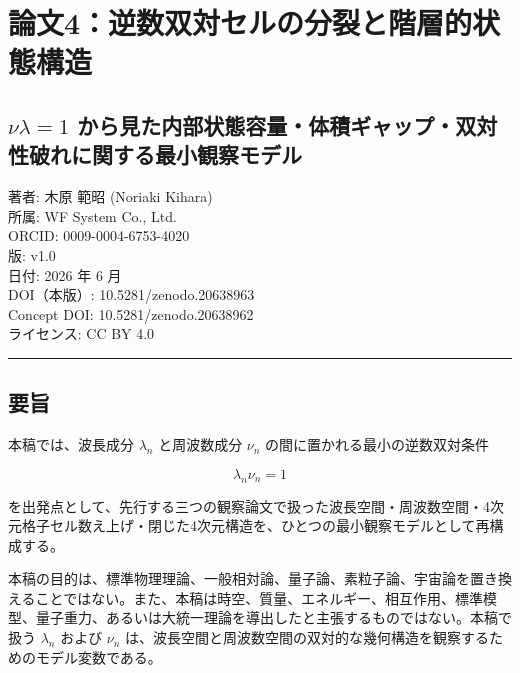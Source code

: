 \documentclass[
]{ltjsarticle}
\author{}
\date{}
\begin{document}
\section{論文4：逆数双対セルの分裂と階層的状態構造}\label{ux8ad6ux65874ux9006ux6570ux53ccux5bfeux30bbux30ebux306eux5206ux88c2ux3068ux968eux5c64ux7684ux72b6ux614bux69cbux9020}

\subsection{\texorpdfstring{\(\nu\lambda=1\)
から見た内部状態容量・体積ギャップ・双対性破れに関する最小観察モデル}{\textbackslash nu\textbackslash lambda=1 から見た内部状態容量・体積ギャップ・双対性破れに関する最小観察モデル}}\label{nulambda1-ux304bux3089ux898bux305fux5185ux90e8ux72b6ux614bux5bb9ux91cfux4f53ux7a4dux30aeux30e3ux30c3ux30d7ux53ccux5bfeux6027ux7834ux308cux306bux95a2ux3059ux308bux6700ux5c0fux89b3ux5bdfux30e2ux30c7ux30eb}

著者: 木原 範昭 (Noriaki Kihara)\\
所属: WF System Co., Ltd.\\
ORCID: 0009-0004-6753-4020\\
版: v1.0\\
日付: 2026 年 6 月\\
DOI（本版）: 10.5281/zenodo.20638963\\
Concept DOI: 10.5281/zenodo.20638962\\
ライセンス: CC BY 4.0

\begin{center}\rule{0.5\linewidth}{0.5pt}\end{center}

\subsection{要旨}\label{ux8981ux65e8}

本稿では、波長成分 \(\lambda_n\) と周波数成分 \(\nu_n\)
の間に置かれる最小の逆数双対条件

\[
\lambda_n\nu_n=1
\]

を出発点として、先行する三つの観察論文で扱った波長空間・周波数空間・4次元格子セル数え上げ・閉じた4次元構造を、ひとつの最小観察モデルとして再構成する。

本稿の目的は、標準物理理論、一般相対論、量子論、素粒子論、宇宙論を置き換えることではない。また、本稿は時空、質量、エネルギー、相互作用、標準模型、量子重力、あるいは大統一理論を導出したと主張するものではない。本稿で扱う
\(\lambda_n\) および \(\nu_n\)
は、波長空間と周波数空間の双対的な幾何構造を観察するためのモデル変数である。
\end{document}
